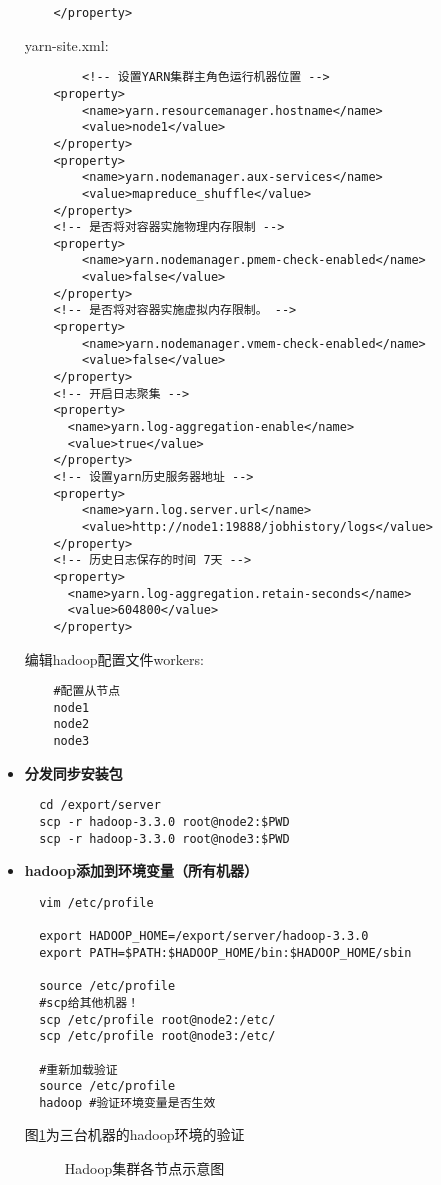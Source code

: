 \documentclass[bachelor]{thesis-uestc}
\begin{document}
\begin{itemize}
\begin{verbatim}
    </property>
\end{verbatim}
yarn-site.xml:
\begin{verbatim}
        <!-- 设置YARN集群主角色运行机器位置 -->
    <property>
    	<name>yarn.resourcemanager.hostname</name>
    	<value>node1</value>
    </property>
    <property>
        <name>yarn.nodemanager.aux-services</name>
        <value>mapreduce_shuffle</value>
    </property>
    <!-- 是否将对容器实施物理内存限制 -->
    <property>
        <name>yarn.nodemanager.pmem-check-enabled</name>
        <value>false</value>
    </property>
    <!-- 是否将对容器实施虚拟内存限制。 -->
    <property>
        <name>yarn.nodemanager.vmem-check-enabled</name>
        <value>false</value>
    </property>
    <!-- 开启日志聚集 -->
    <property>
      <name>yarn.log-aggregation-enable</name>
      <value>true</value>
    </property>
    <!-- 设置yarn历史服务器地址 -->
    <property>
        <name>yarn.log.server.url</name>
        <value>http://node1:19888/jobhistory/logs</value>
    </property>
    <!-- 历史日志保存的时间 7天 -->
    <property>
      <name>yarn.log-aggregation.retain-seconds</name>
      <value>604800</value>
    </property>
\end{verbatim}
编辑hadoop配置文件workers:
\begin{verbatim}
    #配置从节点
    node1
    node2
    node3
\end{verbatim}



\item \textbf{分发同步安装包}
\begin{verbatim}
  cd /export/server
  scp -r hadoop-3.3.0 root@node2:$PWD
  scp -r hadoop-3.3.0 root@node3:$PWD
\end{verbatim}
\item \textbf{hadoop添加到环境变量（所有机器）}
\begin{verbatim}
  vim /etc/profile

  export HADOOP_HOME=/export/server/hadoop-3.3.0
  export PATH=$PATH:$HADOOP_HOME/bin:$HADOOP_HOME/sbin

  source /etc/profile
  #scp给其他机器！
  scp /etc/profile root@node2:/etc/
  scp /etc/profile root@node3:/etc/

  #重新加载验证
  source /etc/profile
  hadoop #验证环境变量是否生效
\end{verbatim}

图\ref{hadoop_check}为三台机器的hadoop环境的验证
\begin{figure}[htbp]
    \centering
    \caption{Hadoop集群各节点示意图}
    \label{hadoop_check}
\end{figure}


\end{itemize}
\end{document}

